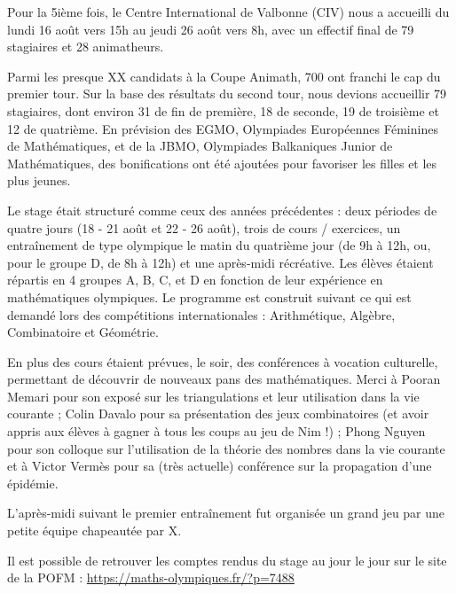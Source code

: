 
Pour la 5ième fois, le Centre International de Valbonne (CIV) nous a accueilli du lundi 16 août vers 15h au jeudi 26 août vers 8h, avec un effectif final de 79 stagiaires et 28 animatheurs.

Parmi les presque XX candidats à la Coupe Animath, 700 ont franchi le cap du premier tour. Sur la base des résultats du second tour, nous devions accueillir 79 stagiaires, dont environ 31 de fin de première, 18 de seconde, 19 de troisième et 12 de quatrième. En prévision des EGMO, Olympiades Européennes Féminines de Mathématiques, et de la JBMO, Olympiades Balkaniques Junior de Mathématiques, des bonifications ont été ajoutées pour favoriser les filles et les plus jeunes.




Le stage était structuré comme ceux des années précédentes : deux périodes de quatre jours (18 - 21 août et 22 - 26 août), trois de cours / exercices, un entraînement %
de type olympique le matin du quatrième jour (de 9h à 12h, ou, pour le groupe D, de 8h à 12h) et une après-midi récréative. Les élèves étaient répartis en 4 groupes A, B, C, et D en fonction de leur expérience en mathématiques olympiques.
Le programme est construit suivant ce qui est demandé lors des compétitions internationales : Arithmétique, Algèbre, Combinatoire et Géométrie.



En plus des cours étaient prévues, le soir, des conférences à vocation culturelle, permettant de découvrir de nouveaux pans des mathématiques. Merci à Pooran Memari pour son exposé sur les triangulations et leur utilisation dans la vie courante ; Colin Davalo pour sa présentation des jeux combinatoires (et avoir appris aux élèves à gagner à tous les coups au jeu de Nim !) ; Phong Nguyen pour son colloque sur l'utilisation de la théorie des nombres dans la vie courante et à Victor Vermès pour sa (très actuelle) conférence sur la propagation d'une épidémie.



L'après-midi suivant le premier entraînement fut organisée un grand jeu par une petite équipe chapeautée par X. %


Il est possible de retrouver les comptes rendus du stage au jour le jour sur le site de la POFM : \url{https://maths-olympiques.fr/?p=7488}

\vfill
\pagebreak
